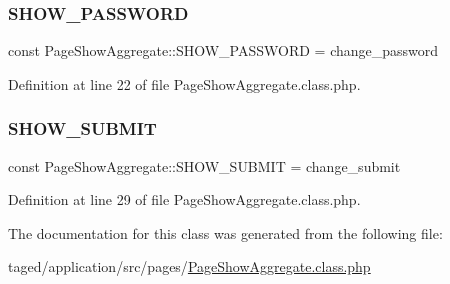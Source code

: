 \subsubsection{\texorpdfstring{S\+H\+O\+W\+\_\+\+P\+A\+S\+S\+W\+O\+RD}{SHOW\_PASSWORD}}
{\footnotesize\ttfamily const Page\+Show\+Aggregate\+::\+S\+H\+O\+W\+\_\+\+P\+A\+S\+S\+W\+O\+RD = \textquotesingle{}change\+\_\+password\textquotesingle{}}



Definition at line 22 of file Page\+Show\+Aggregate.\+class.\+php.

\mbox{\label{class_page_show_aggregate_a6ede66ef73c418c0e99059c1790a5e9a}} 
\subsubsection{\texorpdfstring{S\+H\+O\+W\+\_\+\+S\+U\+B\+M\+IT}{SHOW\_SUBMIT}}
{\footnotesize\ttfamily const Page\+Show\+Aggregate\+::\+S\+H\+O\+W\+\_\+\+S\+U\+B\+M\+IT = \textquotesingle{}change\+\_\+submit\textquotesingle{}}



Definition at line 29 of file Page\+Show\+Aggregate.\+class.\+php.



The documentation for this class was generated from the following file\+:\begin{DoxyCompactItemize}
\item 
taged/application/src/pages/\hyperlink{_page_show_aggregate_8class_8php}{Page\+Show\+Aggregate.\+class.\+php}\end{DoxyCompactItemize}
